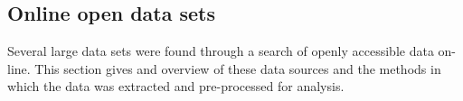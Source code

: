 \subsection{Online open data sets}

Several large data sets were found through a search of openly accessible data on-line. This section gives and overview of these data sources and the methods in which the data was extracted and pre-processed for analysis.